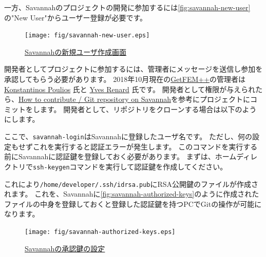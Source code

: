 \documentclass{../../style/ltjoc}
\begin{document}
一方、Savannahのプロジェクトの開発に参加するには\autoref{fig:savannah-new-user}の"New User"からユーザー登録が必要です。
\begin{figure}[htbp]
\centering
\texttt{[image: fig/savannah-new-user.eps]}
\caption{\href{https://savannah.gnu.org/account/register.php}{Savannahの新規ユーザ作成画面}}
\label{fig:savannah-new-user}
\end{figure}
開発者としてプロジェクトに参加するには、管理者にメッセージを送信し参加を承認してもらう必要があります。
2018年10月現在の\href{http://getfem.org}{GetFEM++}の管理者は \href{http://www.dtu.dk/english/service/phonebook/person?id=65472&tab=2&qt=dtupublicationquery}{Konstantinos Poulios} 氏と \href{http://math.univ-lyon1.fr/~renard/}{Yves Renard} 氏です。
開発者として権限が与えられたら、\href{http://getfem.org/project/index.html}{How to contribute / Git repository on Savannah}を参考にプロジェクトにコミットをします。
開発者として、リポジトリをクローンする場合は以下のようにします。
\begin{shbox}
\end{shbox}
ここで、\texttt{savannah-login}はSavannahに登録したユーザ名です。
ただし、何の設定もせずこれを実行すると認証エラーが発生します。
このコマンドを実行する前にSavannahに認証鍵を登録しておく必要があります。
まずは、ホームディレクトリで\texttt{ssh-keygen}コマンドを実行して認証鍵を作成してください。
\begin{shbox}
  \shline{}{}
\end{shbox}
これにより\texttt{/home/developer/.ssh/id\textunderscore{}rsa.pub}にRSA公開鍵のファイルが作成されます。
これを、Savannahに\autoref{fig:savannah-authorized-keys}のように作成されたファイルの中身を登録しておくと登録した認証鍵を持つPCでGitの操作が可能になります。
\begin{figure}[htbp]
\centering
\texttt{[image: fig/savannah-authorized-keys.eps]}
\caption{\href{https://savannah.gnu.org/my/admin/editsshkeys.php}{Savannahの承認鍵の設定}}
\label{fig:savannah-authorized-keys}
\end{figure}
\end{document}
